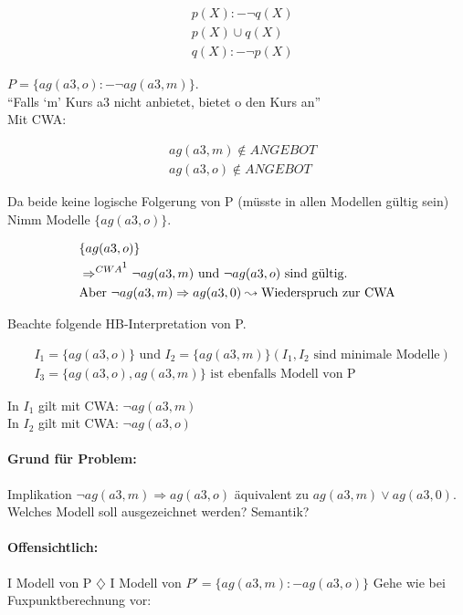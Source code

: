 \documentclass[12pt, a4paper]{article}
\begin{document}
\begin{align*}
&p(X):- \lnot q(X) \\
&p(X) \cup q(X) \\
&q(X) :- \lnot p(X)
\end{align*}

$P = \{ ag(a3, o) :- \lnot ag(a3,m) \}.$ \\
``Falls `m' Kurs a3 nicht anbietet, bietet o den Kurs an'' \\
Mit CWA: 

\begin{align*}
&ag(a3,m) \not\in ANGEBOT \\
&ag(a3,o) \not\in ANGEBOT
\end{align*}

Da beide keine logische Folgerung von P (müsste in allen Modellen gültig sein) Nimm Modelle $\{ ag(a3, o) \}$.

\begin{align*}
&\{ ag(a3, o) \} \\
& \Rightarrow^{CWA\footnotemark} \lnot ag(a3, m) \text{ und } \lnot ag(a3, o) \text{ sind gültig.} \\
& \text{Aber } \lnot ag(a3,m) \Rightarrow ag(a3,0) \leadsto \text{Wiederspruch zur CWA}
\end{align*}

Beachte folgende HB-Interpretation von P.

\begin{align*}
&I_1 = \{ ag(a3, o) \} \text{ und } I_2 = \{ ag(a3, m) \} (I_1, I_2 \text{ sind minimale Modelle}) \\
&I_3 = \{ ag(a3, o), ag(a3,m) \} \text{ ist ebenfalls Modell von P}
\end{align*}

In $I_1$ gilt mit CWA: $\lnot ag(a3,m)$ \\
In $I_2$ gilt mit CWA: $\lnot ag(a3,o)$ \\

\paragraph{Grund für Problem:} Implikation $\lnot ag(a3,m) \Rightarrow ag(a3, o)$ äquivalent zu $ag(a3,m) \vee ag(a3, 0)$. Welches Modell soll ausgezeichnet werden? Semantik?

\paragraph{Offensichtlich:} I Modell von P $\diamondsuit$ I Modell von $P' = \{ ag(a3,m) :- ag(a3, o)\}$
Gehe wie bei Fuxpunktberechnung vor:
\end{document}
